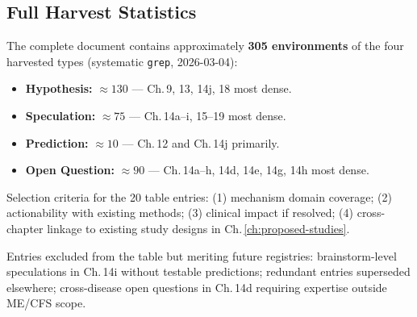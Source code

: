 \subsection*{Full Harvest Statistics}

The complete document contains approximately \textbf{305 environments} of the
four harvested types (systematic \texttt{grep}, 2026-03-04):

\begin{itemize}
  \item \textbf{Hypothesis:} $\approx 130$ --- Ch.\,9, 13, 14j, 18 most dense.
  \item \textbf{Speculation:} $\approx 75$ --- Ch.\,14a--i, 15--19 most dense.
  \item \textbf{Prediction:} $\approx 10$ --- Ch.\,12 and Ch.\,14j primarily.
  \item \textbf{Open Question:} $\approx 90$ --- Ch.\,14a--h, 14d, 14e, 14g, 14h most dense.
\end{itemize}

Selection criteria for the 20 table entries: (1) mechanism domain coverage;
(2) actionability with existing methods; (3) clinical impact if resolved;
(4) cross-chapter linkage to existing study designs in Ch.\,\ref{ch:proposed-studies}.

Entries excluded from the table but meriting future registries:
brainstorm-level speculations in Ch.\,14i without testable predictions;
redundant entries superseded elsewhere; cross-disease open questions in Ch.\,14d
requiring expertise outside ME/CFS scope.
